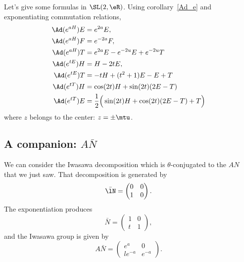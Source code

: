 Let's give some formulas in $\SL(2,\eR)$. Using corollary~\ref{Ad_e} and exponentiating commutation relations,
\begin{subequations}  \label{eq_eaHsldr}
\begin{align}
\Ad(e^{aH})E&=e^{2a}E,\\
\Ad(e^{aH})F&=e^{-2a}F,\\
\Ad( e^{aH})T&= e^{2a}E- e^{-2u}E+ e^{-2u}T\\
\Ad(e^{tE})H&=H-2tE,                            \label{eq_AdetE}\\
\Ad( e^{tE})T&=-tH+(t^2+1)E-E+T\\
\Ad( e^{tT})H&=\cos(2t)H+\sin(2t)(2E-T)\\
\Ad( e^{tT})E&=\frac{ 1 }{2}\Big( \sin(2t)H+\cos(2t)(2E-T)+T \Big)
\end{align}
\end{subequations}
where $z$ belongs to the center: $z=\pm\mtu$.

                    \subsection{A companion: \texorpdfstring{$A\bar N$}{AN}}

We can consider the Iwasawa decomposition which is $\theta$-conjugated to the $AN$ that we just saw. That decomposition is generated by
\begin{equation}
    \bar\lN=\begin{pmatrix}
    0   &   0   \\
    1   &   0
\end{pmatrix}.
\end{equation}
The exponentiation produces
\begin{equation}
    \bar N=\begin{pmatrix}
    1   &   0   \\
    t   &   1
\end{pmatrix},
\end{equation}
and the Iwasawa group is given by
\begin{equation}        \label{EqGeneANbarSLdeuxR}
    A\bar N=\begin{pmatrix}
    e^a &   0   \\
    l e^{-a}    &    e^{-a}
\end{pmatrix}.
\end{equation}

